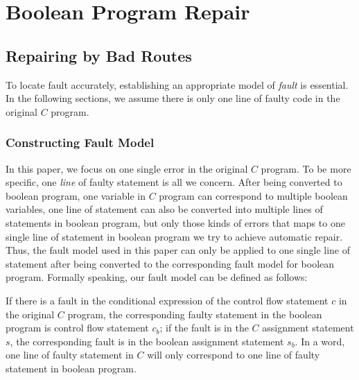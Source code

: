 
\section{Boolean Program Repair}
\label{section:BooleanProgramRepair}
\subsection{Repairing by Bad Routes}
To locate fault accurately, establishing an appropriate model of {\it fault} is essential. In the following sections, we assume there is only one line of faulty code in the original $C$ program.
\subsubsection{Constructing Fault Model}
In this paper, we focus on one single error in the original $C$ program. To be more specific, one {\it line} of faulty statement is all we concern.
After being converted to boolean program, one variable in $C$ program can correspond to multiple boolean variables, one line of statement can also be converted into multiple lines of statements in boolean program,
but only those kinds of errors that maps to one single line of statement in boolean program we try to achieve automatic repair.
Thus, the fault model used in this paper can only be applied to one single line of statement after being converted to the corresponding fault model for boolean program.
Formally speaking, our fault model can be defined as follows:
\begin{definition}
If there is a fault in the conditional expression of the control flow statement $c$ in the original $C$ program, the corresponding faulty statement in the boolean program is control flow statement $c_{b}$;
if the fault is in the $C$ assignment statement $s$, the corresponding fault is in the boolean assignment statement $s_{b}$.
In a word, one line of faulty statement in $C$ will only correspond to one line of faulty statement in boolean program.
\end{definition}

